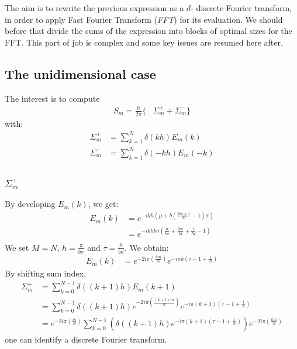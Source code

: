 The aim is to rewrite the previous expression as a $d$- discrete Fourier transform, in order to apply Fast Fourier Transform (\emph{FFT}) for its evaluation.
We should before that divide the sums of the expression into blocks of optimal sizes for the FFT. This part of job is complex and some key issues are resumed here after.

\subsection{The unidimensional case}

The interest is to compute
\begin{align}
S_{m}=\frac{h}{2\pi}\Big\{&\Sigma_{m}^{+} + \Sigma_{m}^{-} \Big\}
\end{align}
with:
\begin{align}
\Sigma_{m}^{+}&=\sum_{k=1}^{N}\delta( kh)E_{m}(k)\\
\Sigma_{m}^{-}&=\sum_{k=1}^{N}\delta(-kh)E_{m}(-k)\\
\end{align}

\subsubsection{$\Sigma_{m}^{+}$}
By developing $E_m(k)$, we get:
\begin{align*}
E_{m}(k)&=e^{-ikh\left(\mu+b\left(\frac{2m+1}{M}-1\right)\sigma\right)}\\
&=e^{-ikhb\sigma\left(\frac{\mu}{b\sigma}+\frac{2m}{M}+\frac{1}{M}-1\right)}\\
\end{align*}
We set $M=N$, $h=\frac{\pi}{b\sigma}$ and $\tau=\frac{\mu}{b\sigma}$. We obtain:
\begin{align*}
E_{m}(k)&=e^{-2i\pi\left(\frac{k m}{N}\right)}e^{-i\pi k\left(\tau-1+\frac{1}{N}\right)}
\end{align*}
By shifting sum index,
\begin{align*}
\Sigma_{m}^{+}&=\sum_{k=0}^{N-1}\delta((k+1)h)E_{m}(k+1)\\
  &=\sum_{k=0}^{N-1}\delta((k+1)h) e^{-2i\pi\left(\frac{(k+1) m}{N}\right)} e^{-i\pi (k+1)\left(\tau-1+\frac{1}{N}\right)}\\
  &=e^{-2i\pi\left(\frac{m}{N}\right)} \sum_{k=0}^{N-1}\left(\delta((k+1)h) e^{-i\pi (k+1)\left(\tau-1+\frac{1}{N}\right)}\right) e^{-2i\pi\left(\frac{k m}{N}\right)} 
\end{align*}
one can identify a discrete Fourier transform.

